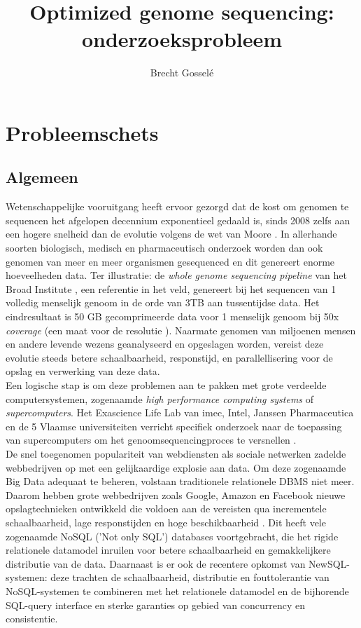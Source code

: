 \documentclass{article}
\begin{document}
\title{Optimized genome sequencing: onderzoeksprobleem}

\author{Brecht Gossel\'e}
\maketitle


\section{Probleemschets}

\subsection{Algemeen}

Wetenschappelijke vooruitgang heeft ervoor gezorgd dat de kost om genomen te sequencen het afgelopen decennium exponentieel gedaald is, sinds 2008 zelfs aan een hogere snelheid dan de evolutie volgens de wet van Moore \cite{wetterstrand_sequencing_cost}. In allerhande soorten biologisch, medisch en pharmaceutisch onderzoek worden dan ook genomen van meer en meer organismen gesequenced en dit genereert enorme hoeveelheden data. Ter illustratie: de \textit{whole genome sequencing pipeline} van het Broad Institute \cite{broad_institute}, een referentie in het veld, genereert bij het sequencen van 1 volledig menselijk genoom in de orde van 3TB aan tussentijdse data. Het eindresultaat is 50 GB gecomprimeerde data voor 1 menselijk genoom bij 50x \textit{coverage} (een maat voor de resolutie \cite{coverage_definition}). Naarmate genomen van miljoenen mensen en andere levende wezens geanalyseerd en opgeslagen worden, vereist deze evolutie steeds betere schaalbaarheid, responstijd, en parallellisering voor de opslag en verwerking van deze data.\\
Een logische stap is om deze problemen aan te pakken met grote verdeelde computersystemen, zogenaamde \textit{high performance computing systems} of \textit{supercomputers}. Het Exascience Life Lab van imec, Intel, Janssen Pharmaceutica en de 5 Vlaamse universiteiten verricht specifiek onderzoek naar de toepassing van supercomputers om het genoomsequencingproces te versnellen \cite{lifelab_bwa}\cite{exascience_life_lab}.\\
De snel toegenomen populariteit van webdiensten als sociale netwerken zadelde webbedrijven op met een gelijkaardige explosie aan data. Om deze zogenaamde Big Data \cite{mashey1997big} adequaat te beheren, volstaan traditionele relationele DBMS niet meer. Daarom hebben grote webbedrijven zoals Google, Amazon en Facebook nieuwe opslagtechnieken ontwikkeld die voldoen aan de vereisten qua incrementele schaalbaarheid, lage responstijden en hoge beschikbaarheid \cite{baker2011megastore}. Dit heeft vele zogenaamde NoSQL ('Not only SQL') databases voortgebracht, die het rigide relationele datamodel inruilen voor betere schaalbaarheid en gemakkelijkere distributie van de data. Daarnaast is er ook de recentere opkomst van NewSQL-systemen: deze trachten de schaalbaarheid, distributie en fouttolerantie van NoSQL-systemen te combineren met het relationele datamodel en de bijhorende SQL-query interface en sterke garanties op gebied van concurrency en consistentie.
\end{document}
